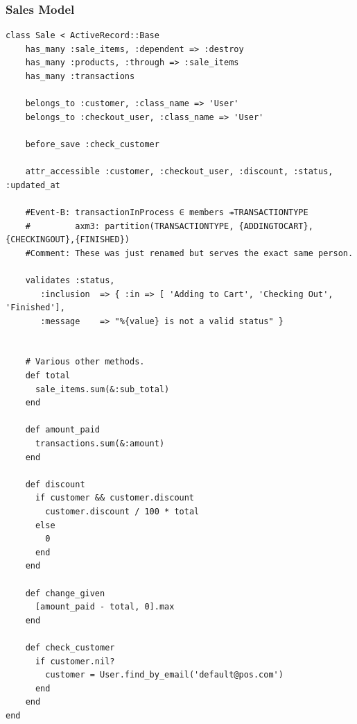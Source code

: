 \documentclass[a4paper]{article}
\begin{document}
\subsubsection{Sales Model}
\begin{verbatim}
class Sale < ActiveRecord::Base
    has_many :sale_items, :dependent => :destroy
    has_many :products, :through => :sale_items
    has_many :transactions

    belongs_to :customer, :class_name => 'User'
    belongs_to :checkout_user, :class_name => 'User'

    before_save :check_customer

    attr_accessible :customer, :checkout_user, :discount, :status, :updated_at

    #Event-B: transactionInProcess ∈ members ⇸TRANSACTIONTYPE
    #         axm3: partition(TRANSACTIONTYPE, {ADDINGTOCART},{CHECKINGOUT},{FINISHED})
    #Comment: These was just renamed but serves the exact same person.

    validates :status,
       :inclusion  => { :in => [ 'Adding to Cart', 'Checking Out', 'Finished'],
       :message    => "%{value} is not a valid status" }


    # Various other methods.
    def total
      sale_items.sum(&:sub_total)
    end

    def amount_paid
      transactions.sum(&:amount)
    end

    def discount
      if customer && customer.discount
        customer.discount / 100 * total
      else
        0
      end
    end

    def change_given
      [amount_paid - total, 0].max
    end

    def check_customer
      if customer.nil?
        customer = User.find_by_email('default@pos.com')
      end
    end
end

\end{verbatim}
\end{document}
